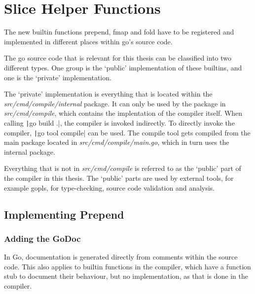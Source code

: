 
\section{Slice Helper Functions}
The new builtin functions prepend, fmap and fold have to be registered and implemented
in different places within go's source code.

The go source code that is relevant for this thesis can be classified into two different
types. One group is the `public' implementation of these builtins, and one is the `private'
implementation.

The `private' implementation is everything that is located within the \textit{src/cmd/compile/internal}
package\cite{internal-packages}. It can only be used by the package in \textit{src/cmd/compile}, which
contains the implentation of the compiler itself. When calling \texttt|go build .|, the
compiler is invoked indirectly. To directly invoke the compiler, \texttt|go tool compile|
can be used. The compile tool gets compiled from the main package located in \textit{src/cmd/compile/main.go},
which in turn uses the internal package.


Everything that is not in \textit{src/cmd/compile} is referred to as the `public' part of the compiler in this thesis.
The `public' parts are used by external tools, for example \gls{gopls}, for type-checking, source code
validation and analysis.

\subsection{Implementing Prepend}

\subsubsection{Adding the GoDoc}
In Go, documentation is generated directly from comments within the source code\cite{godoc}. This also applies to
builtin functions in the compiler, which have a function stub to document their behaviour\cite{godoc-builtin},
but no implementation, as that is done in the compiler\cite{builtin-impl}.

